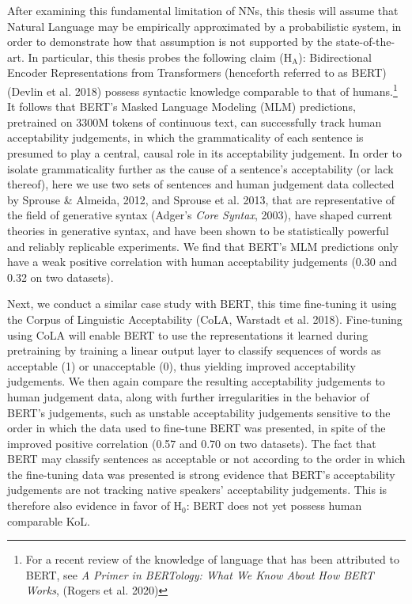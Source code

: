 After examining this fundamental limitation of NNs, this thesis will assume that Natural Language may be empirically approximated by a probabilistic system, in order to demonstrate how that assumption is not supported by the state-of-the-art.  In particular, this thesis probes the following claim ($\mathrm{H}_\mathrm{A}$): Bidirectional Encoder Representations from Transformers (henceforth referred to as BERT) (Devlin et al. 2018) possess syntactic knowledge comparable to that of humans.\footnote{For a recent review of the knowledge of language that has been attributed to BERT, see \textit{A Primer in BERTology: What We Know About How BERT Works}, (Rogers et al. 2020)} It follows that BERT's Masked Language Modeling (MLM) predictions, pretrained on 3300M tokens of continuous text, can successfully track human acceptability judgements, in which the grammaticality of each sentence is presumed to play a central, causal role in its acceptability judgement.  In order to isolate grammaticality further as the cause of a sentence's acceptability (or lack thereof), here we use two sets of sentences and human judgement data collected by Sprouse & Almeida, 2012, and Sprouse et al. 2013, that are representative of the field of generative syntax (Adger's \textit{Core Syntax}, 2003), have shaped current theories in generative syntax, and have been shown to be statistically powerful and reliably replicable experiments.  We find that BERT's MLM predictions only have a weak positive correlation with human acceptability judgements (0.30 and 0.32 on two datasets).

Next, we conduct a similar case study with BERT, this time fine-tuning it using the Corpus of Linguistic Acceptability (CoLA, Warstadt et al. 2018).  Fine-tuning using CoLA will enable BERT to use the representations it learned during pretraining by training a linear output layer to classify sequences of words as acceptable (1) or unacceptable (0), thus yielding improved acceptability judgements.  We then again compare the resulting acceptability judgements to human judgement data, along with further irregularities in the behavior of BERT's judgements, such as unstable acceptability judgements sensitive to the order in which the data used to fine-tune BERT was presented, in spite of the improved positive correlation (0.57 and 0.70 on two datasets).  The fact that BERT may classify sentences as acceptable or not according to the order in which the fine-tuning data was presented is strong evidence that BERT's acceptability judgements are not tracking native speakers' acceptability judgements.  This is therefore also evidence in favor of $\mathrm{H}_0$: BERT does not yet possess human comparable KoL.

